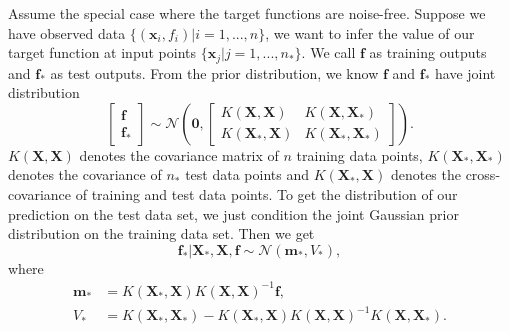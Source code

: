 \documentclass[11pt,a4paper]{article}
\theoremstyle{definition}
\numberwithin{equation}{section}
\let\vec\mathbf
\begin{document}
Assume the special case where the target functions are noise-free. Suppose we have observed data $\{(\vec x_i,f_i)|i=1,...,n\}$, we want to infer the value of our target function at input points $\{\vec x_j | j = 1,...,n_*\}$. We call $\vec f$ as training outputs and $\vec f_*$ as test outputs. From the prior distribution, we know 
	$\vec f$ and $\vec f_*$ have joint distribution
	\begin{equation} \label{}
	\begin{bmatrix}
	\vec f\\
	\vec f_*
	\end{bmatrix}
	\sim
	\mathcal{N}\left(\vec 0, 
	\begin{bmatrix}
	K(\vec X,\vec X) & K(\vec X,\vec X_*)\\
	K(\vec X_*,\vec X) & K(\vec X_*,\vec X_*)
	\end{bmatrix}
	\right).
	\end{equation}
	$K(\vec X,\vec X)$ denotes the covariance matrix of $n$ training data points, $K(\vec X_*,\vec X_*)$ denotes the covariance of $n_*$ test data points and $K(\vec X_*,\vec X)$ denotes the cross-covariance of training and test data points. To get the distribution of our prediction on the test data set, we just condition the joint Gaussian prior distribution on the training data set. Then we get
	\begin{equation} \label{eq:pred1}
	\vec f_* | \vec X_*, \vec X, \vec f \sim \mathcal N (\vec m_*, V_*),
	\end{equation}
	where
	\begin{equation} \label{eq:pred2}
	\begin{split}
	\vec m_* &= K(\vec X_*,\vec X)K(\vec X,\vec X)^{-1}\vec f,\\
	V_* &= K(\vec X_*,\vec X_*) - K(\vec X_*,\vec X)K(\vec X,\vec X)^{-1}K(\vec X,\vec X_*).
	\end{split}
	\end{equation}
	
\end{document}
